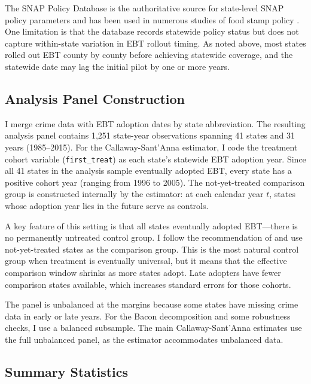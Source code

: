 \documentclass[12pt]{article}
\begin{document}


The SNAP Policy Database is the authoritative source for state-level SNAP policy parameters and has been used in numerous studies of food stamp policy \citep{hastings2019ebt, hoynes2016us}. One limitation is that the database records statewide policy status but does not capture within-state variation in EBT rollout timing. As noted above, most states rolled out EBT county by county before achieving statewide coverage, and the statewide date may lag the initial pilot by one or more years.

\subsection{Analysis Panel Construction}

I merge crime data with EBT adoption dates by state abbreviation. The resulting analysis panel contains 1,251 state-year observations spanning 41 states and 31 years (1985--2015). For the Callaway-Sant'Anna estimator, I code the treatment cohort variable (\texttt{first\_treat}) as each state's statewide EBT adoption year. Since all 41 states in the analysis sample eventually adopted EBT, every state has a positive cohort year (ranging from 1996 to 2005). The not-yet-treated comparison group is constructed internally by the estimator: at each calendar year $t$, states whose adoption year lies in the future serve as controls.

A key feature of this setting is that all states eventually adopted EBT---there is no permanently untreated control group. I follow the recommendation of \citet{callaway2021difference} and use not-yet-treated states as the comparison group. This is the most natural control group when treatment is eventually universal, but it means that the effective comparison window shrinks as more states adopt. Late adopters have fewer comparison states available, which increases standard errors for those cohorts.

The panel is unbalanced at the margins because some states have missing crime data in early or late years. For the Bacon decomposition and some robustness checks, I use a balanced subsample. The main Callaway-Sant'Anna estimates use the full unbalanced panel, as the estimator accommodates unbalanced data.

\subsection{Summary Statistics}
\end{document}
